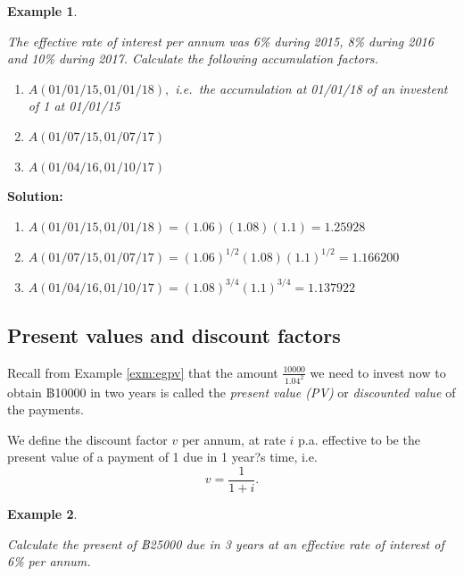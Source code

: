 \documentclass[landscape, 20pt]{extreport}
\theoremstyle{definition}
\theoremstyle{definition}
\newtheorem{example}{Example}[chapter]
\theoremstyle{definition}
\theoremstyle{definition}
\theoremstyle{remark}
\begin{document}
\newpage \begin{example}
\protect\hypertarget{exm:unlabeled-div-13}{}\label{exm:unlabeled-div-13}

\emph{The effective rate of interest per annum was 6\%
during 2015, 8\% during 2016 and 10\% during 2017. Calculate the following
accumulation factors.}

\begin{enumerate}
\def\labelenumi{\arabic{enumi}.}
\item
  \emph{\(A(01/01/15, 01/01/18),\) i.e.~the accumulation at 01/01/18 of an
  investent of 1 at 01/01/15}
\item
  \emph{\(A(01/07/15, 01/07/17)\)}
\item
  \emph{\(A(01/04/16, 01/10/17)\)}
\end{enumerate}

\end{example}

\textbf{Solution:}

\begin{enumerate}
\def\labelenumi{\arabic{enumi}.}
\item
  \(A(01/01/15, 01/01/18) = (1.06)(1.08)(1.1) = 1.25928\)
\item
  \(A(01/07/15, 01/07/17) = (1.06)^{1/2}(1.08)(1.1)^{1/2} = 1.166200\)
\item
  \(A(01/04/16, 01/10/17) = (1.08)^{3/4}(1.1)^{3/4} = 1.137922\)
\end{enumerate}

\hypertarget{present-values-and-discount-factors}{%
\subsection{Present values and discount factors}\label{present-values-and-discount-factors}}

Recall from Example \ref{exm:egpv} that the amount \(\displaystyle{\frac{10000}{1.04^2}}\)
we need to invest now to obtain ฿10000 in two years is called the
\emph{present value (PV)} or \emph{discounted value} of the payments.

We define the discount factor \(v\) per annum, at rate \(i\) p.a. effective
to be the present value of a payment of 1 due in 1 year?s time, i.e.
\[v = \frac{1}{1+i}.\]

\newpage \begin{example}
\protect\hypertarget{exm:unlabeled-div-14}{}\label{exm:unlabeled-div-14}

\emph{Calculate the present of ฿25000 due in 3 years at an
effective rate of interest of 6\% per annum.}

\end{example}
\end{document}
